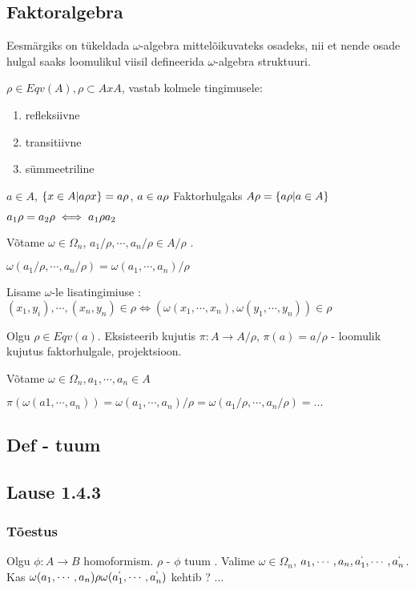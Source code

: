 \documentclass[12pt]{report}
\numberwithin{equation}{section}
\theoremstyle{definition}
\theoremstyle{plain}
\begin{document}
\subsection{Faktoralgebra}

Eesmärgiks on t\"ukeldada $\omega$-algebra mittelõikuvateks osadeks, nii et nende osade hulgal saaks loomulikul viisil defineerida $\omega$-algebra struktuuri. 

$\rho \in Eqv(A), \rho \subset A x A $, vastab kolmele tingimusele:
\begin{enumerate}
\item refleksiivne
\item transitiivne
\item s\"ummeetriline
\end{enumerate}
$a \in A$, $\{x \in A | a \rho x \} = a \/ \rho$, $a \in a \/ \rho$ Faktorhulgaks $A \/ \rho = \{ a \/ \rho | a \in A \}$ 

$a_1 \/ \rho = a_2 \/ \rho \iff a_1 \rho a_2$

Võtame $\omega \in \Omega_n$, $a_1 / \rho , \cdots , a_n / \rho \in A / \rho$ .

$\omega(a_1 / \rho , \cdots , a_n / \rho) = \omega(a_1,\cdots,a_n)/ \rho$

Lisame $\omega$-le lisatingimiuse : $(x_1,y_i),\cdots, (x_n,y_n)  \in \rho \iff ( \omega(x_1, \cdots , x_n), \omega(y_1,\cdots,y_n)) \in \rho$

Olgu $\rho \in Eqv(a)$.
Eksisteerib kujutis $ \pi : A \rightarrow A/ \rho$, $\pi (a) = a / \rho $ - loomulik kujutus faktorhulgale, projektsioon.


Võtame $\omega \in \Omega_n, a_1,\cdots,a_n \in A$

$\pi(\omega(a1,\cdots,a_n)) = \omega(a_1,\cdots,a_n)/\rho = \omega( a_1 / \rho, \cdots , a_n / \rho) = ...$

\subsection{Def - tuum}


\subsection{Lause 1.4.3}

\subsubsection*{Tõestus}
Olgu $\phi : A \rightarrow B$ homoformism. $\rho$ - $\phi $ tuum . 
Valime $\omega \in \Omega_n$, $a_1,\cdots,a_n,a_1^{`},\cdots,a_n^{`}$. Kas $\omega(a_1,\cdots ,a_n) \rho \omega(a_1^{`},\cdots ,a_n^{`})$ kehtib ? ...
\end{document}
